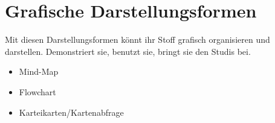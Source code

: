 \chapter{Grafische Darstellungsformen}
\label{grafische-darstellungsformen}

Mit diesen Darstellungsformen könnt ihr Stoff grafisch organisieren und darstellen. Demonstriert sie, benutzt sie, bringt sie den Studis bei.

\begin{itemize}
 \item Mind-Map
 \item Flowchart
 \item Karteikarten/Kartenabfrage
\end{itemize}
